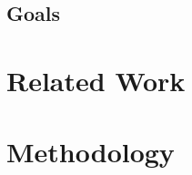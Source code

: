\documentclass[a4paper, 12pt]{article}
\begin{document}





\subsection{Goals}



\section{Related Work}



\section{Methodology}

\end{document}
